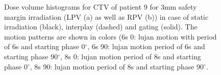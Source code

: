 \documentclass[type=dr, dr=rernat, accentcolor=tud7b,colorbacktitle, bigchapter, openright, twoside, 12pt ]{tudthesis}
\begin{document}
\newpage


 \begin{figure}[H]
 \begin{center}
\caption{Dose volume histograms for CTV of patient 9 for 3mm safety margin irradiation (LPV (a) as well as RPV (b)) in case of static 
irradiation (black), interplay (dashed) and gating (solid). The motion patterns are shown in colors (6s 0: lujan motion with period of 6s 
and starting phase 0$^{\circ}$, 6s 90: lujan motion period of 6s and starting phase 90$^{\circ}$, 8s 0: lujan motion period of 8s 
and starting phase 0$^{\circ}$, 8s 90: lujan motion period of 8s and starting phase 90$^{\circ}$.}
\label{dvhs_pat09_mdacc}
 \end{center}
\end{figure}
\end{document}
